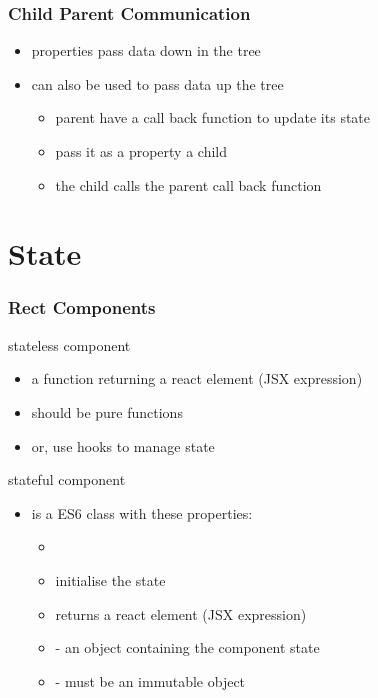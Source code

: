 \begin{frame}[fragile] \frametitle{Child Parent Communication}
\begin{itemize}
  \item properties pass data down in the tree
  \item can also be used to pass data up the tree
  \begin{itemize}
    \item parent have a call back function to update its state
    \item pass it as a property a child
    \item the child calls the parent call back function
  \end{itemize}
\end{itemize}
\end{frame}


\section{State}
\begin{frame}[fragile] \frametitle{Rect Components}
stateless component
\begin{itemize}
  \item a function returning a react element (JSX expression)
  \item should be pure functions
  \item or, use hooks to manage state
\end{itemize}

stateful component
\begin{itemize}
  \item is a ES6 class with these properties:
  \begin{itemize}
    \item {}
    \item {} initialise the state
    \item {} returns a react element (JSX expression)
    \item {} - an object containing the component state
    \item {} - must be an immutable object
  \end{itemize}
\end{itemize}
\end{frame}

